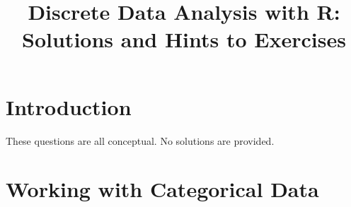 \documentclass[11pt]{report}\usepackage[]{graphicx}\usepackage[]{color}
\title{\sffamily Discrete Data Analysis with R: \\ Solutions and Hints to Exercises}
\begin{document}
\maketitle



\chapter{Introduction}\label{ch:intro}
These questions are all conceptual.  No solutions are provided.




\chapter{Working with Categorical Data}\label{ch:working}
\end{document}
